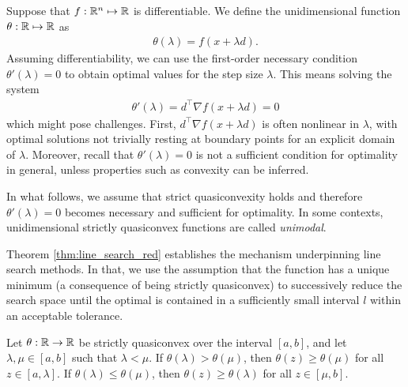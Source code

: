 Suppose that $f: \mathbb{R}^n \mapsto \mathbb{R}$ is differentiable. We define the unidimensional function $\theta: \mathbb{R} \mapsto \mathbb{R}$ as
%
\begin{align*}
\theta(\lambda) = f(x + \lambda d).
\end{align*}
%
Assuming differentiability, we can use the first-order necessary condition $\theta'(\lambda) = 0$ to obtain optimal values for the step size $\lambda$. This means solving the system
%
\begin{align*}
\theta'(\lambda) = d^\top\nabla f(x + \lambda d) = 0
\end{align*}
%
which might pose challenges. First, $d^\top\nabla f(x + \lambda d)$ is often nonlinear in $\lambda$, with optimal solutions not trivially resting at boundary points for an explicit domain of $\lambda$. Moreover, recall that $\theta'(\lambda) = 0$ is not a sufficient condition for optimality in general, unless  properties such as convexity can be inferred. 

In what follows, we assume that strict quasiconvexity holds and therefore $\theta'(\lambda) = 0$ becomes necessary and sufficient for optimality. In some contexts, unidimensional strictly quasiconvex functions are called \emph{unimodal}.

Theorem \ref{thm:line_search_red} establishes the mechanism underpinning line search methods. In that, we use the assumption that the function has a unique minimum (a consequence of being strictly quasiconvex) to successively reduce the search space until the optimal is contained in a sufficiently small interval $l$ within an acceptable tolerance.
%
\begin{theorem}\label{thm:line_search_red}
Let $\theta:\mathbb{R} \rightarrow \mathbb{R}$ be strictly quasiconvex over the interval $[a,b]$, and let $\lambda, \mu \in [a,b]$ such that $\lambda < \mu$. If $\theta(\lambda) > \theta(\mu)$, then $\theta(z) \geq \theta(\mu)$ for all $z \in [a,\lambda]$. If $\theta(\lambda) \leq \theta(\mu)$, then $\theta(z) \geq \theta(\lambda)$ for all $z \in [\mu, b]$.
\end{theorem}

